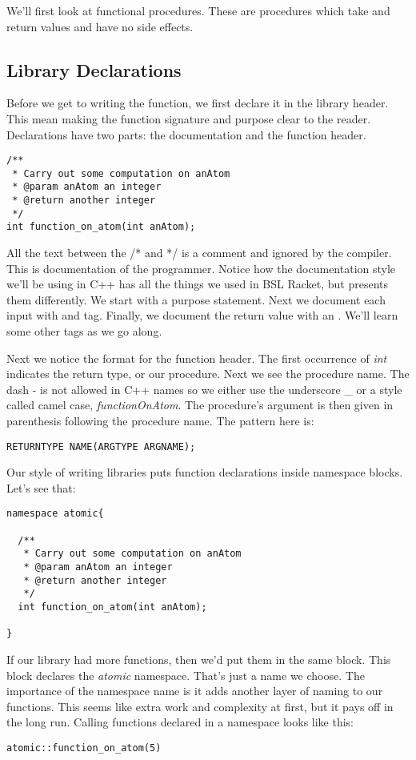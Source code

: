 \documentclass[]{tufte-handout}
\begin{document}
We'll first look at functional procedures. These are procedures which take and return values and have no side effects.  

\subsection{Library Declarations}

Before we get to writing the function, we first declare it in the library header. This mean making the function signature and purpose clear to the reader.  Declarations have two parts: the documentation and the function header. 
\begin{verbatim}
/**
 * Carry out some computation on anAtom
 * @param anAtom an integer
 * @return another integer
 */
int function_on_atom(int anAtom);

\end{verbatim}
All the text between the /* and */ is a comment and ignored by the compiler.  This is documentation of the programmer. Notice how the documentation style we'll be using in C++ has all the things we used in BSL Racket, but presents them differently. We start with a purpose statement. Next we document each input with and \@param tag. Finally, we document the return value with an \@return.  We'll learn some other tags as we go along. 

Next we notice the format for the function header. The first occurrence of \textit{int} indicates the return type, or our procedure. Next we see the procedure name. The dash - is not allowed in C++ names so we either use the underscore \_ or a style called camel case, \textit{functionOnAtom}. The procedure's argument is then given in parenthesis following the procedure name. The pattern here is:
\begin{verbatim}
RETURNTYPE NAME(ARGTYPE ARGNAME);
\end{verbatim} 


Our style of writing libraries puts function declarations inside namespace blocks. Let's see that:
\begin{verbatim}
namespace atomic{

  /**
   * Carry out some computation on anAtom
   * @param anAtom an integer
   * @return another integer
   */
  int function_on_atom(int anAtom);

}
\end{verbatim}
If our library had more functions, then we'd put them in the same block. This block declares the \textit{atomic} namespace.  That's just a name we choose.  The importance of the namespace name is it adds another layer of naming to our functions. This seems like extra work and complexity at first, but it pays off in the long run. Calling functions declared in a namespace looks like this:
\begin{verbatim}
atomic::function_on_atom(5)
\end{verbatim}
\end{document}
